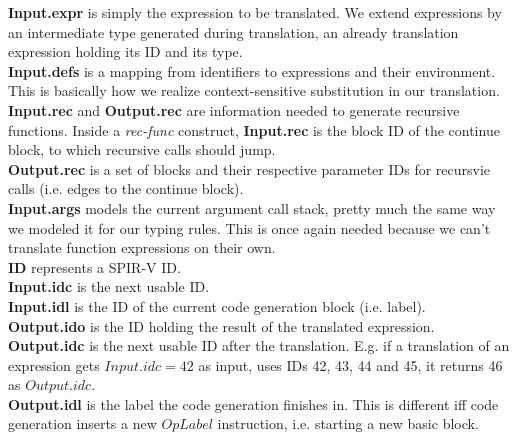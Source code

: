 \documentclass[letterpaper,12pt]{article}
\begin{document}
\textbf{Input.expr} is simply the expression to be translated. We extend expressions
by an intermediate type generated during translation, an already translation
expression holding its ID and its type. \\
\textbf{Input.defs} is a mapping from identifiers to expressions and their environment.
This is basically how we realize context-sensitive substitution in our
translation. \\
\textbf{Input.rec} and \textbf{Output.rec} are information needed to generate recursive
functions. Inside a \textit{rec-func} construct, \textbf{Input.rec} is the block 
ID of the continue block, to which recursive calls should jump. \\
\textbf{Output.rec} is a set of blocks and their respective parameter IDs for
recursvie calls (i.e. edges to the continue block). \\
\textbf{Input.args} models the current argument call stack, pretty much the same
way we modeled it for our typing rules. This is once again needed because
we can't translate function expressions on their own. \\
\textbf{ID} represents a SPIR-V ID. \\
\textbf{Input.idc} is the next usable ID. \\
\textbf{Input.idl} is the ID of the current code generation block (i.e. label). \\
\textbf{Output.ido} is the ID holding the result of the translated expression. \\
\textbf{Output.idc} is the next usable ID after the translation.
E.g. if a translation of an expression gets $Input.idc = 42$ as input, 
uses IDs 42, 43, 44 and 45, it returns 46 as $Output.idc$. \\
\textbf{Output.idl} is the label the code generation finishes in.
This is different iff code generation inserts a new $OpLabel$ instruction,
i.e. starting a new basic block. \\

\end{document}
